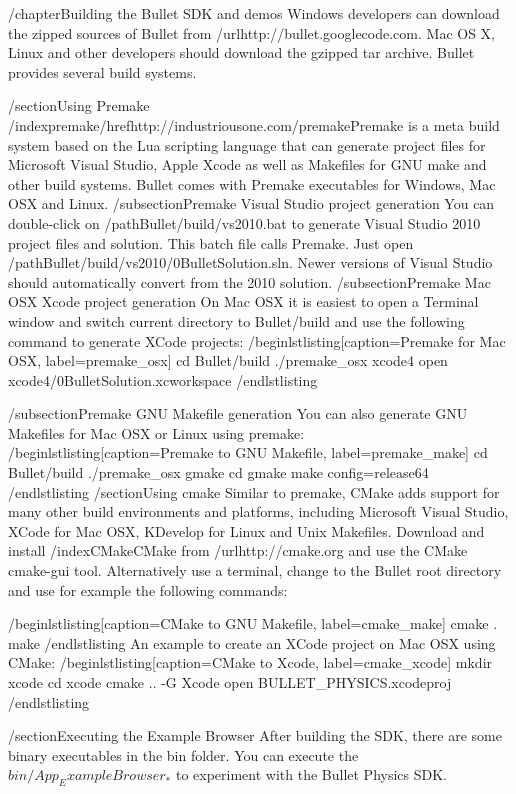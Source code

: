 /chapter{Building the Bullet SDK and demos}
Windows developers can download the zipped sources of Bullet from /url{http://bullet.googlecode.com}. Mac OS X, Linux and other developers should download the gzipped tar archive.
Bullet provides several build systems.

/section{Using Premake}
/index{premake}/href{http://industriousone.com/premake}{Premake} is a meta build system based on the Lua scripting language that can generate project files for Microsoft Visual Studio, Apple Xcode as well as Makefiles for GNU make and other build systems. Bullet comes with Premake executables for Windows, Mac OSX and Linux.
/subsection{Premake Visual Studio project generation}
You can double-click on /path{Bullet/build/vs2010.bat} to generate Visual Studio 2010 project files and solution. This batch file calls Premake. Just open /path{Bullet/build/vs2010/0BulletSolution.sln}. Newer versions of Visual Studio should automatically convert from the 2010 solution.
/subsection{Premake Mac OSX Xcode project generation}
On Mac OSX it is easiest to open a Terminal window and switch current directory to Bullet/build and use the following command to generate XCode projects:
 /begin{lstlisting}[caption=Premake for Mac OSX, label=premake_osx]
cd Bullet/build
./premake_osx xcode4
open xcode4/0BulletSolution.xcworkspace
/end{lstlisting}

/subsection{Premake GNU Makefile generation}
You can also generate GNU Makefiles for Mac OSX or Linux using premake:
/begin{lstlisting}[caption=Premake to GNU Makefile, label=premake_make]
cd Bullet/build
./premake_osx gmake
cd gmake
make config=release64
/end{lstlisting}
/section{Using cmake}
Similar to premake, CMake adds support for many other build environments and platforms, including Microsoft Visual Studio, XCode for Mac OSX, KDevelop for Linux and Unix Makefiles. Download and install /index{CMake}CMake from /url{http://cmake.org} and use the CMake cmake-gui tool. Alternatively use a terminal, change to the Bullet root directory and use for example the following commands:

/begin{lstlisting}[caption=CMake to GNU Makefile, label=cmake_make]
cmake . 
make
/end{lstlisting}
An example to create an XCode project on Mac OSX using CMake:
/begin{lstlisting}[caption=CMake to Xcode, label=cmake_xcode]
mkdir xcode
cd xcode
cmake .. -G Xcode
open BULLET_PHYSICS.xcodeproj
/end{lstlisting}


/section{Executing the Example Browser}
After building the SDK, there are some binary executables in the bin folder. You can execute the $bin/App_ExampleBrowser_*$ to experiment with the Bullet Physics SDK.